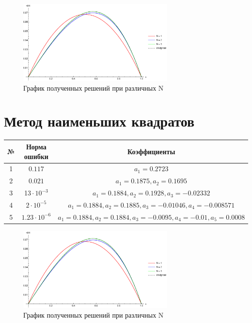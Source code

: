 \documentclass[12pt,a4paper]{article}
\begin{document}
    \begin{figure}[h]
        \centering
        \includegraphics[width=0.7\textwidth]{4.pdf}
        \caption{График полученных решений при различных N}
    \end{figure}

    \section{Метод наименьших квадратов}

    \begin{center}
        \begin{tabular}{|c|c|c|} 
         \hline
         № & Норма ошибки & Коэффициенты \\ 
         \hline
         1 & $0.117$ & $a_1=0.2723$ \\ 
         \hline
         2 & $0.021$ & $a_1=0.1875, a_2=0.1695$ \\ 
         \hline
         3 & 1$3\cdot10^{-3}$ & $a_1=0.1884, a_2=0.1928, a_3=-0.02332$ \\ 
         \hline
         4 & $2\cdot10^{-5}$ & $a_1=0.1884, a_2=0.1885, a_3=-0.01046, a_4=-0.008571$ \\ 
         \hline
         5 & $1.23\cdot10^{-6}$ & $a_1=0.1884, a_2=0.1884, a_3=-0.0095, a_4=-0.01, a_5=0.0008$ \\ 
         \hline
        \end{tabular}
    \end{center}

    \begin{figure}[h]
        \centering
        \includegraphics[width=0.7\textwidth]{5.pdf}
        \caption{График полученных решений при различных N}
    \end{figure}
\end{document}
